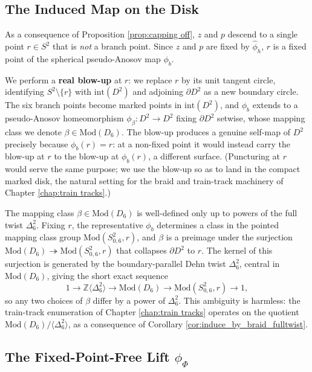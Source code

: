 \subsection{The Induced Map on the Disk}

As a consequence of Proposition \ref{prop:capping off}, $z$ and $p$ descend to a single point $r \in S^2$ that is \emph{not} a branch point. Since $z$ and $p$ are fixed by $\hat{\phi}_h$, $r$ is a fixed point of the spherical pseudo-Anosov map $\phi_b$.

We perform a \textbf{real blow-up} at $r$: we replace $r$ by its unit tangent circle, identifying $S^2 \setminus \{r\}$ with $\mathrm{int}(D^2)$ and adjoining $\partial D^2$ as a new boundary circle. The six branch points become marked points in $\mathrm{int}(D^2)$, and $\phi_b$ extends to a pseudo-Anosov homeomorphism $\phi_\beta \colon D^2 \to D^2$ fixing $\partial D^2$ setwise, whose mapping class we denote $\beta \in \mathrm{Mod}(D_6)$. The blow-up produces a genuine self-map of $D^2$ precisely because $\phi_b(r) = r$: at a non-fixed point it would instead carry the blow-up at $r$ to the blow-up at $\phi_b(r)$, a different surface. (Puncturing at $r$ would serve the same purpose; we use the blow-up so as to land in the compact marked disk, the natural setting for the braid and train-track machinery of Chapter \ref{chap:train tracks}.)

\begin{remark}\label{rem:fulltwist_ambiguity}
The mapping class $\beta \in \mathrm{Mod}(D_6)$ is well-defined only up to powers of the full twist $\Delta_6^2$. Fixing $r$, the representative $\phi_b$ determines a class in the pointed mapping class group $\mathrm{Mod}(S^2_{0,6}, r)$, and $\beta$ is a preimage under the surjection $\mathrm{Mod}(D_6) \twoheadrightarrow \mathrm{Mod}(S^2_{0,6}, r)$ that collapses $\partial D^2$ to $r$. The kernel of this surjection is generated by the boundary-parallel Dehn twist $\Delta_6^2$, central in $\mathrm{Mod}(D_6)$, giving the short exact sequence
\[
1 \to \mathbb{Z}\langle \Delta_6^2 \rangle \to \mathrm{Mod}(D_6) \to \mathrm{Mod}(S^2_{0,6}, r) \to 1,
\]
so any two choices of $\beta$ differ by a power of $\Delta_6^2$. This ambiguity is harmless: the train-track enumeration of Chapter \ref{chap:train tracks} operates on the quotient $\mathrm{Mod}(D_6)/\langle \Delta_6^2 \rangle$, as a consequence of Corollary \ref{cor:induce_by_braid_fulltwist}.
\end{remark}

\subsection{The Fixed-Point-Free Lift $\phi_\Phi$}

